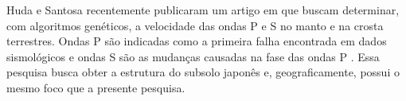 Huda e Santosa \cite{ijse5762} recentemente publicaram um artigo em que buscam determinar, com algoritmos genéticos, a velocidade das ondas P e S no manto e na crosta terrestres. Ondas P são indicadas como a primeira falha encontrada em dados sismológicos e ondas S são as mudanças causadas na fase das ondas P \cite{ijse5762}. Essa pesquisa busca obter a estrutura do subsolo japonês e, geograficamente, possui o mesmo foco que a presente pesquisa.







